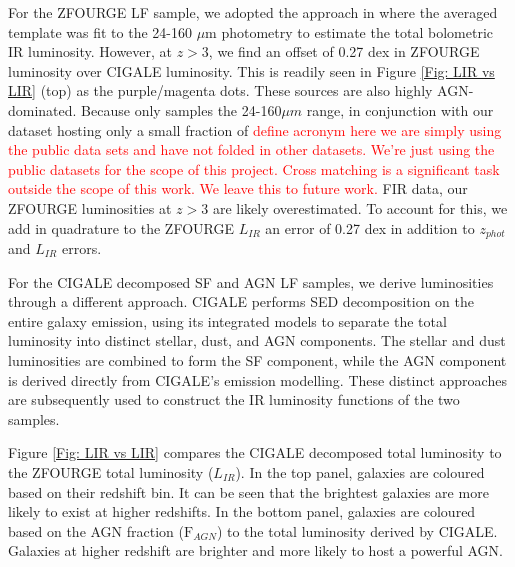 For the ZFOURGE LF sample, we adopted the approach in \cite{straatman_fourstar_2016} where the averaged \cite{wuyts_fireworks_2008} template was fit to the 24-160 $\mu$m photometry to estimate the total bolometric IR luminosity. However, at $z>3$, we find an offset of 0.27 dex in ZFOURGE luminosity over CIGALE luminosity. This is readily seen in Figure \ref{Fig: LIR vs LIR} (top) as the purple/magenta dots. These sources are also highly AGN-dominated. Because \cite{wuyts_fireworks_2008} only samples the 24-160$\mu m$ range, in conjunction with our dataset hosting only a small fraction of \textcolor{red}{define acronym here} \textcolor{red}{we are simply using the public data sets and have not folded in other datasets. We're just using the public datasets for the scope of this project. Cross matching is a significant task outside the scope of this work. We leave this to future work.} FIR data, our ZFOURGE luminosities at $z>3$ are likely overestimated. To account for this, we add in quadrature to the ZFOURGE $L_{IR}$ an error of 0.27 dex in addition to $z_{phot}$ and $L_{IR}$ errors.

For the CIGALE decomposed SF and AGN LF samples, we derive luminosities through a different approach. CIGALE performs SED decomposition on the entire galaxy emission, using its integrated models to separate the total luminosity into distinct stellar, dust, and AGN components. The stellar and dust luminosities are combined to form the SF component, while the AGN component is derived directly from CIGALE's emission modelling. These distinct approaches are subsequently used to construct the IR luminosity functions of the two samples. 

Figure \ref{Fig: LIR vs LIR} compares the CIGALE decomposed total luminosity to the ZFOURGE total luminosity ($L_{IR}$). In the top panel, galaxies are coloured based on their redshift bin. It can be seen that the brightest galaxies are more likely to exist at higher redshifts. In the bottom panel, galaxies are coloured based on the AGN fraction ($\mathrm{F}_{AGN}$) to the total luminosity derived by CIGALE. Galaxies at higher redshift are brighter and more likely to host a powerful AGN.

